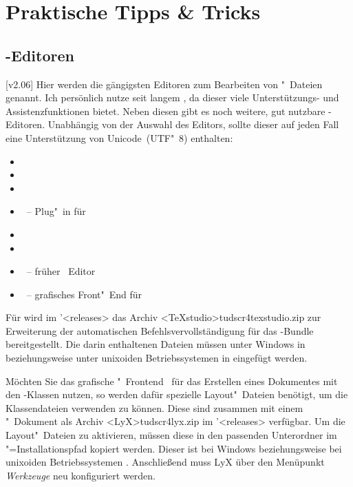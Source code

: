 \chapter{Praktische Tipps \& Tricks}
\newcommand*\TaT{\hyperref[sec:tips]{Tipps \& Tricks}:\xspace}
\section{-Editoren}
%
[v2.06]
%
Hier werden die gängigsten Editoren zum Bearbeiten von "~Dateien 
genannt. Ich persönlich nutze seit langem , da 
dieser viele Unterstützungs- und Assistenzfunktionen bietet. Neben diesen gibt 
es noch weitere, gut nutzbare -Editoren. Unabhängig von der 
Auswahl des Editors, sollte dieser auf jeden Fall eine Unterstützung von 
Unicode~(UTF"~8) enthalten:
%
\begin{itemize}
\item {}
\item {}
\item {}
\item {}~-- Plug"~in für 
\item {}
\item {}
\item {}~-- früher ~Editor
\item {}~-- grafisches Front"~End für 
\end{itemize}
%
Für  wird im \GitHubRepo'<releases> das Archiv 
\GitHubDownload<TeXstudio>{tudscr4texstudio.zip} zur Erweiterung der 
automatischen Befehlsvervollständigung für das \TUDScript-Bundle 
bereitgestellt. Die darin enthaltenen Dateien müssen unter Windows in 
 beziehungsweise unter unixoiden 
Betriebssystemen in  eingefügt werden.

Möchten Sie das grafische "~Frontend~ 
für das Erstellen eines Dokumentes mit den \TUDScript-Klassen nutzen, so werden 
dafür spezielle Layout"~Dateien benötigt, um die Klassendateien verwenden zu 
können. Diese sind zusammen mit einem "~Dokument als 
Archiv \GitHubDownload<LyX>{tudscr4lyx.zip} im \GitHubRepo'<releases> 
verfügbar. Um die Layout"~Dateien zu aktivieren, müssen diese in den passenden 
Unterordner im "=Installationspfad kopiert werden. 
Dieser ist bei Windows
beziehungsweise bei unixoiden Betriebssystemen .
Anschließend muss LyX über den Menüpunkt \emph{Werkzeuge} neu konfiguriert 
werden. 



